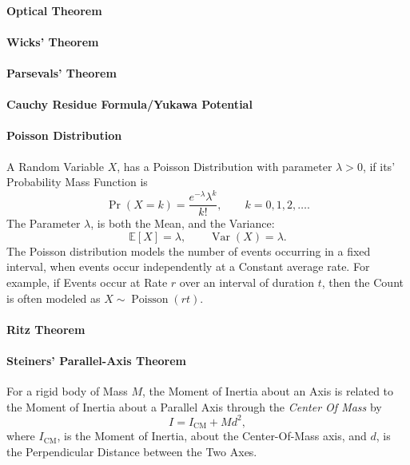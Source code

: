 \documentclass[a4paper, 10pt, onepage]{elegantbook}
\begin{document}
{\newpage

\paragraph{Optical Theorem}

\paragraph{Wicks' Theorem}

\paragraph{Parsevals' Theorem}

\paragraph{Cauchy Residue Formula/Yukawa Potential}

\paragraph{Poisson Distribution}

A Random Variable $X$, has a Poisson Distribution with parameter
$\lambda>0$, if its' Probability Mass Function is
\[
\Pr(X=k)=\frac{e^{-\lambda}\lambda^k}{k!},
\qquad k=0,1,2,\ldots.
\]
The Parameter $\lambda$, is both the Mean, and the Variance:
\[
\mathbb{E}[X]=\lambda,
\qquad
\operatorname{Var}(X)=\lambda.
\]
The Poisson distribution models the number of events occurring in a fixed interval, when events occur independently at a Constant average rate. For example, if Events occur at Rate $r$ over an interval of duration $t$, then the Count is often modeled as $X\sim\operatorname{Poisson}(rt)$.

\newpage

\paragraph{Ritz Theorem}

\paragraph{Steiners' Parallel-Axis Theorem}

For a rigid body of Mass $M$, the Moment of Inertia about an Axis is related to the Moment of Inertia about a Parallel Axis through the \emph{Center Of Mass} by
\[
I=I_{\mathrm{CM}}+Md^2,
\]
where $I_{\mathrm{CM}}$, is the Moment of Inertia, about the Center-Of-Mass axis, and $d$, is the Perpendicular Distance between the Two Axes.  \\

}
\end{document}
